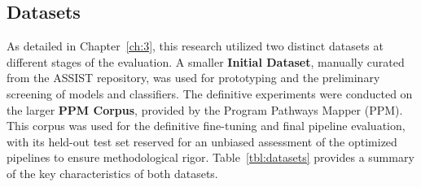 \subsection{Datasets}\label{ch:4.1.2}
As detailed in Chapter~\ref{ch:3}, this research utilized two distinct datasets at different stages of the evaluation. A smaller \textbf{Initial Dataset}, manually curated from the ASSIST repository, was used for prototyping and the preliminary screening of models and classifiers. The definitive experiments were conducted on the larger \textbf{PPM Corpus}, provided by the Program Pathways Mapper (PPM). This corpus was used for the definitive fine-tuning and final pipeline evaluation, with its held-out test set reserved for an unbiased assessment of the optimized pipelines to ensure methodological rigor. Table~\ref{tbl:datasets} provides a summary of the key characteristics of both datasets.

\begin{table}[tb]
    \captionsetup{skip=5pt}
    \centering
    \caption{Summary of Datasets Used in Evaluation}
    \label{tbl:datasets}
\end{table}

